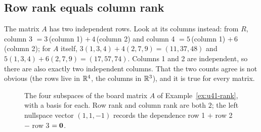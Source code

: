 \subsection{Row rank equals column rank}

The matrix $A$ has two independent rows. Look at its columns instead: from $R$, column 3 $=3\,$(column 1) $+\,4\,$(column 2) and column 4 $=5\,$(column 1) $+\,6\,$(column 2); for $A$ itself, $3(1,3,4)+4(2,7,9)=(11,37,48)$ and $5(1,3,4)+6(2,7,9)=(17,57,74)$. Columns 1 and 2 are independent, so there are also exactly two independent columns. That the two counts agree is not obvious (the rows live in $\mathbb{R}^{4}$, the columns in $\mathbb{R}^{3}$), and it is true for every matrix.

\begin{figure}[ht]\centering
{}
\caption{The four subspaces of the board matrix $A$ of Example~\ref{ex:u41-rank}, with a basis for each. Row rank and column rank are both $2$; the left nullspace vector $(1,1,-1)$ records the dependence row 1 $+$ row 2 $-$ row 3 $=\boldsymbol{0}$.}\label{fig:u41-four}
\end{figure}

